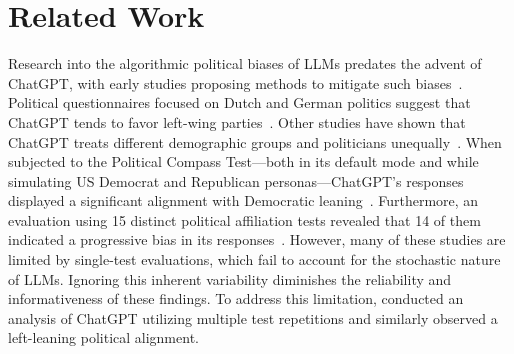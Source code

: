 \section{Related Work}
Research into the algorithmic political biases of LLMs predates the advent of ChatGPT, with early studies proposing methods to mitigate such biases~\cite{aibias, liu2022quantifying}.
Political questionnaires focused on Dutch and German politics suggest that ChatGPT tends to favor left-wing parties~\cite{van2023chatgpt, hartmann2023political}.
Other studies have shown that ChatGPT treats different demographic groups and politicians unequally~\cite{mcgee2023chat, rozado2023danger, mcgee2023were}.
When subjected to the Political Compass Test---both in its default mode and while simulating US Democrat and Republican personas---ChatGPT's responses displayed a significant alignment with Democratic leaning~\cite{motoki2023more}.
Furthermore, an evaluation using 15 distinct political affiliation tests revealed that 14 of them indicated a progressive bias in its responses~\cite{rozado2023political}.
However, many of these studies are limited by single-test evaluations, which fail to account for the stochastic nature of LLMs.
Ignoring this inherent variability diminishes the reliability and informativeness of these findings.
To address this limitation, \cite{rutinowski2024self} conducted an analysis of ChatGPT utilizing multiple test repetitions and similarly observed a left-leaning political alignment.


